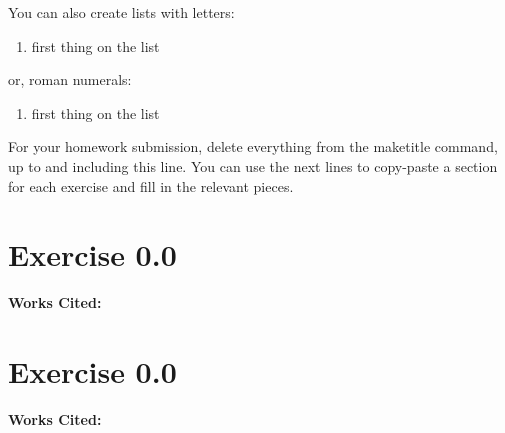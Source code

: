 \documentclass{article}
\begin{document}
\noindent You can also create lists with letters:
\begin{enumerate}[label=\alph*.]
    \item first thing on the list
\end{enumerate}
\noindent or, roman numerals:
\begin{enumerate}[label=\roman*.]
    \item first thing on the list
\end{enumerate}

For your homework submission, delete everything from the maketitle command, up to and including this line.  You can use the next lines to copy-paste a section for each exercise and fill in the relevant pieces. 

\section*{Exercise 0.0}  


\vspace{0.5cm} %
\textbf{Works Cited:}

\section*{Exercise 0.0}  


\vspace{0.5cm} %
\textbf{Works Cited:} 
\end{document}
